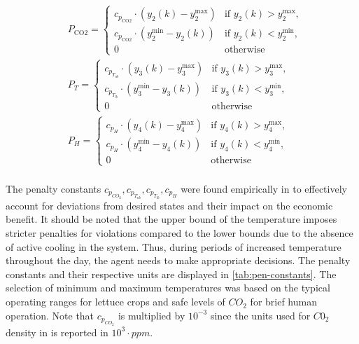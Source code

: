 \begin{equation}
\begin{aligned}
& P_{\text{CO2}} = 
\begin{cases} 
c_{p_{\text{CO2}}} \cdot (y_2(k) - y_2^{\text{max}}) & \text{if } y_2(k) > y_2^{\text{max}} , \\
c_{p_{\text{CO2}}} \cdot (y_2^{\text{min}} - y_2(k)) & \text{if } y_2(k) < y_2^{\text{min}} , \\
0 & \text{otherwise}
\end{cases}
\\
& P_{T} = 
\begin{cases} 
c_{p_{T_{ub}}} \cdot (y_3(k) - y_3^{\text{max}}) & \text{if } y_3(k) > y_3^{\text{max}} , \\
c_{p_{T_{lb}}} \cdot (y_3^{\text{min}} - y_3(k)) & \text{if } y_3(k) < y_3^{\text{min}} , \\
0 & \text{otherwise}
\end{cases}
\\
& P_{H} = 
\begin{cases} 
c_{p_{H}} \cdot (y_4(k) - y_4^{\text{max}}) & \text{if } y_4(k) > y_4^{\text{max}} , \\
c_{p_{H}} \cdot (y_4^{\text{min}} - y_4(k)) & \text{if } y_4(k) < y_4^{\text{min}} , \\
0 & \text{otherwise}
\end{cases}
\\
\end{aligned}
\end{equation}

The penalty constants $c_{p_{CO_2}}, c_{p_{T_{ub}}},c_{p_{T_{lb}}},c_{p_{H}}$ were found empirically in \citet{jansenOptimalControlLettuce2023} to effectively account for deviations from desired states and their impact on the economic benefit. It should be noted that the upper bound of the temperature imposes stricter penalties for violations compared to the lower bounds due to the absence of active cooling in the system. Thus, during periods of increased temperature throughout the day, the agent needs to make appropriate decisions. The penalty constants and their respective units are displayed in \autoref{tab:pen-constants}. The selection of minimum and maximum temperatures was based on the typical operating ranges for lettuce crops and  safe levels of $CO_2$ for brief human operation. Note that $c_{p_{CO_2}}$ is multiplied by $10^{-3}$ since the units used for $C0_2$ density in \citet{jansenOptimalControlLettuce2023} is reported in $10^3 \cdot ppm$.

